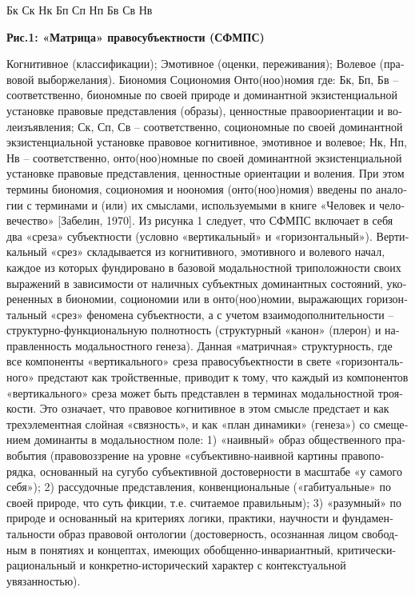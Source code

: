 \begin{russian}
          Бк                 Ск                  Нк
          Бп                 Сп                                                     Нп
          Бв                 Св                  Нв

    {\centering \textbf{Рис.1: «Матрица» правосубъектности (СФМПС)} \par}


    Когнитивное (классификации);
    Эмотивное (оценки, переживания); 
    Волевое (правовой выборжелания).
    Биономия Социономия Онто(ноо)номия
    где:
    Бк, Бп, Бв – соответственно, биономные по своей природе и доминантной экзистенциальной установке   правовые представления (образы), ценностные правоориентации и волеизъявления;    
    Ск, Сп, Св – соответственно, социономные по своей доминантной экзистенциальной установке правовое когнитивное, эмотивное и волевое;   
    Нк, Нп, Нв – соответственно, онто(ноо)номные по своей доминантной экзистенциальной установке правовые представления, ценностные ориентации и воления. При этом термины биономия, социономия и ноономия (онто(ноо)номия) введены по аналогии с терминами и (или) их смыслами, используемыми в книге «Человек и человечество» [Забелин, 1970]. 
    Из рисунка 1 следует, что СФМПС включает в себя два «среза» субъектности (условно «вертикальный» и «горизонтальный»). Вертикальный «срез» складывается из когнитивного, эмотивного и волевого начал, каждое из которых фундировано в базовой модальностной триположности своих выражений в зависимости от наличных субъектных доминантных состояний, укорененных в биономии, социономии или в онто(ноо)номии, выражающих горизонтальный «срез» феномена субъектности, а с учетом взаимодополнительности – структурно-функциональную полнотность (структурный «канон» (плерон) и направленность модальностного генеза).
    Данная «матричная» структурность, где все компоненты «вертикального» среза правосубъектности в свете «горизонтального» предстают как тройственные, приводит к тому, что каждый из компонентов «вертикального» среза может быть представлен в терминах модальностной троякости.  Это означает, что правовое когнитивное в этом смысле предстает и как трехэлементная слойная «связность», и как «план динамики» (генеза») со смещением доминанты в модальностном поле: 1) «наивный» образ общественного правобытия (правовоззрение на уровне «субъективно-наивной картины правопорядка, основанный на сугубо субъективной достоверности в масштабе «у самого себя»); 2) рассудочные представления, конвенциональные («габитуальные» по своей природе, что суть фикции, т.е. считаемое правильным); 3) «разумный» по природе и основанный на критериях логики, практики, научности и фундаментальности образ правовой онтологии (достоверность, осознанная лицом свободным в понятиях и концептах, имеющих обобщенно-инвариантный, критически-рациональный и  конкретно-исторический характер с контекстуальной увязанностью).  

\end{russian}
